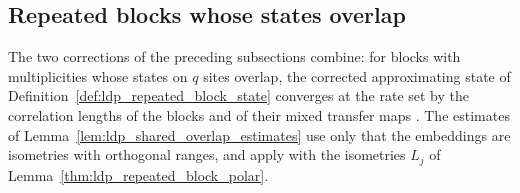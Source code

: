 
\subsection{Repeated blocks whose states overlap}\label{sec:ldp_repeated_overlapping_blocks}

The two corrections of the preceding subsections combine: for blocks with
multiplicities whose states on $q$ sites overlap, the corrected approximating state
of Definition~\ref{def:ldp_repeated_block_state} converges at the rate set by the
correlation lengths of the blocks and of their mixed transfer maps
\cite{gap:mswc24_repeated_block_corrected_state,gap:mswc24_block_form_mixed_overlap}.
The estimates of Lemma~\ref{lem:ldp_shared_overlap_estimates} use only that the
embeddings are isometries with orthogonal ranges, and apply with the isometries
$L_j$ of Lemma~\ref{thm:ldp_repeated_block_polar}.

